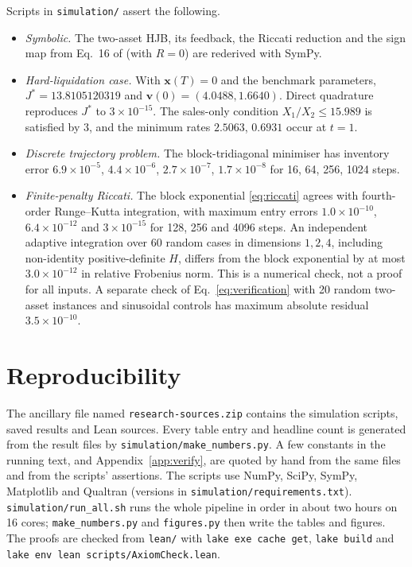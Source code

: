 \documentclass[11pt,a4paper]{article}
\theoremstyle{remark}
\newcommand{\x}{\mathbf x}
\newcommand{\vv}{\mathbf v}
\begin{document}
Scripts in \nolinkurl{simulation/} assert the following.
\begin{itemize}
\item \emph{Symbolic.} The two-asset HJB, its feedback, the Riccati
reduction and the sign map from Eq.~16 of \cite{bdg} (with $R=0$) are
rederived with SymPy.
\item \emph{Hard-liquidation case.} With $\x(T)=0$ and the benchmark
parameters, $J^*=13.8105120319$ and $\vv(0)=(4.0488,1.6640)$. Direct
quadrature reproduces $J^*$ to $3\times10^{-15}$. The sales-only condition
$X_1/X_2\le15.989$ is satisfied by $3$, and the minimum rates
$2.5063$, $0.6931$ occur at $t=1$.
\item \emph{Discrete trajectory problem.} The block-tridiagonal minimiser
has inventory error $6.9\times10^{-5}$, $4.4\times10^{-6}$,
$2.7\times10^{-7}$, $1.7\times10^{-8}$ for 16, 64, 256, 1024 steps.
\item \emph{Finite-penalty Riccati.} The block exponential
\eqref{eq:riccati} agrees with fourth-order Runge--Kutta integration, with
maximum entry errors $1.0\times10^{-10}$, $6.4\times10^{-12}$ and
$3\times10^{-15}$ for 128, 256 and 4096 steps.
An independent adaptive integration over 60 random cases in dimensions
$1,2,4$, including non-identity positive-definite $H$, differs from the block
exponential by at most $3.0\times10^{-12}$ in relative Frobenius norm. This
is a numerical check, not a proof for all inputs. A separate check of
Eq.~\eqref{eq:verification} with 20 random two-asset instances and sinusoidal
controls has maximum absolute residual $3.5\times10^{-10}$.
\end{itemize}

\section{Reproducibility}
\label{app:code}

The ancillary file named \texttt{research-sources.zip} contains the
simulation scripts, saved results and Lean sources. Every table entry and
headline count is generated from the result files by
\nolinkurl{simulation/make_numbers.py}. A few constants in the running text, and
Appendix~\ref{app:verify}, are quoted by hand from the same files and from
the scripts' assertions. The scripts use NumPy, SciPy, SymPy, Matplotlib and
Qualtran (versions in \nolinkurl{simulation/requirements.txt}). \nolinkurl{simulation/run_all.sh} runs the
whole pipeline in order in about two hours on 16 cores; \nolinkurl{make_numbers.py} and \nolinkurl{figures.py} then write the
tables and figures. The proofs are checked from \nolinkurl{lean/} with \texttt{lake exe cache get}, \texttt{lake build} and
\texttt{lake env lean scripts/AxiomCheck.lean}.
\end{document}
